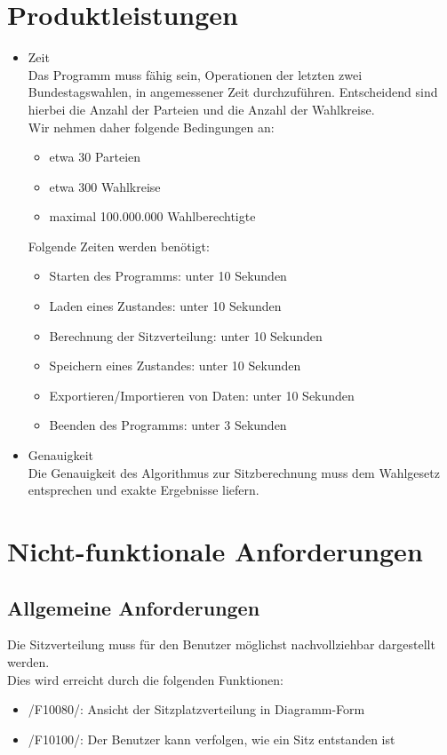 \documentclass[10pt,a4paper]{article}
\begin{document}
\section{Produktleistungen}
\begin{itemize}
	\item Zeit \hfill \\
	Das Programm muss fähig sein, Operationen der letzten zwei Bundestagswahlen, in angemessener Zeit durchzuführen. Entscheidend sind hierbei die Anzahl der Parteien und die Anzahl der Wahlkreise.
	\\ Wir nehmen daher folgende Bedingungen an:
	\begin{itemize}
		\item etwa 30 Parteien
		\item etwa 300 Wahlkreise
		\item maximal 100.000.000 Wahlberechtigte
	\end{itemize}
	Folgende Zeiten werden benötigt:
	\begin{itemize}
		\item Starten des Programms: unter 10 Sekunden
		\item Laden eines Zustandes: unter 10 Sekunden
		\item Berechnung der Sitzverteilung: unter 10 Sekunden
		\item Speichern eines Zustandes: unter 10 Sekunden
		\item Exportieren/Importieren von Daten: unter 10 Sekunden
		\item Beenden des Programms: unter 3 Sekunden
	\end{itemize}
	\item Genauigkeit \hfill \\
	Die Genauigkeit des Algorithmus zur Sitzberechnung muss dem Wahlgesetz entsprechen und exakte Ergebnisse liefern.
\end{itemize}


\section{Nicht-funktionale Anforderungen}
\subsection{Allgemeine Anforderungen}
Die Sitzverteilung muss für den Benutzer möglichst nachvollziehbar dargestellt werden. \hfill \\
Dies wird erreicht durch die folgenden Funktionen:
\begin{itemize}
	\item /F10080/: Ansicht der Sitzplatzverteilung in Diagramm-Form
	\item /F10100/: Der Benutzer kann verfolgen, wie ein Sitz entstanden ist
\end{itemize}
\end{document}
